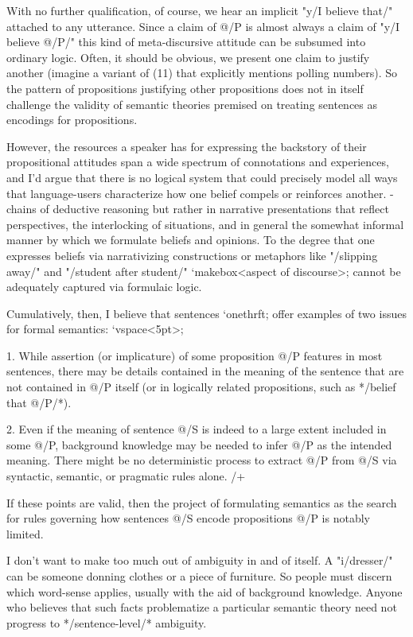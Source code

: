 With no further qualification, of course, we 
hear an implicit "y/I believe that/" attached to any utterance.  Since a 
claim of @/P is almost always a claim of "y/I believe @/P/" this kind of 
meta-discursive attitude can be subsumed into ordinary logic.   
Often, it should be obvious, we present one claim to justify another 
(imagine a variant of (11) that explicitly mentions polling numbers).  
So the pattern of propositions justifying other propositions 
does not in itself challenge the validity of semantic theories 
premised on treating sentences as encodings for propositions.

However, the resources a speaker has for expressing the backstory of their 
propositional attitudes span a wide spectrum of connotations and experiences, 
and I'd argue that there is no logical system that could precisely model 
all ways that language-users characterize how one belief compels 
or reinforces another.   -%
chains of deductive reasoning but rather in narrative presentations 
that reflect perspectives, the interlocking of situations, and 
in general the somewhat informal manner by which 
we formulate beliefs and opinions.  To the degree that one 
expresses beliefs via narrativizing constructions or metaphors like 
"/slipping away/" and "/student after student/" %
`makebox<aspect of discourse>; cannot be adequately captured via formulaic logic.


Cumulatively, then, I believe that sentences `onethrft; offer examples 
of two issues for formal semantics: `vspace<5pt>;

 1.  While assertion (or implicature) of some proposition @/P  
features in most sentences, there may be details contained in 
the meaning of the sentence that are not contained in @/P itself 
(or in logically related propositions, such as */belief that @/P/*).

 2.  Even if the meaning of sentence @/S is indeed to a large extent included in some 
@/P, background knowledge may be needed to infer @/P as the intended 
meaning.  There might be no deterministic process to extract @/P from 
@/S via syntactic, semantic, or pragmatic rules alone.
/+

If these points are valid, then the project of formulating semantics as the search 
for rules governing how sentences @/S encode propositions @/P is notably limited.  

I don't want to make too much out of ambiguity in and of itself.  
A "i/dresser/" can be someone donning clothes or a piece of furniture.  
So people must discern which word-sense applies, usually with the aid of background knowledge.  
Anyone who believes that such facts problematize a particular semantic theory 
need not progress to */sentence-level/* ambiguity.

